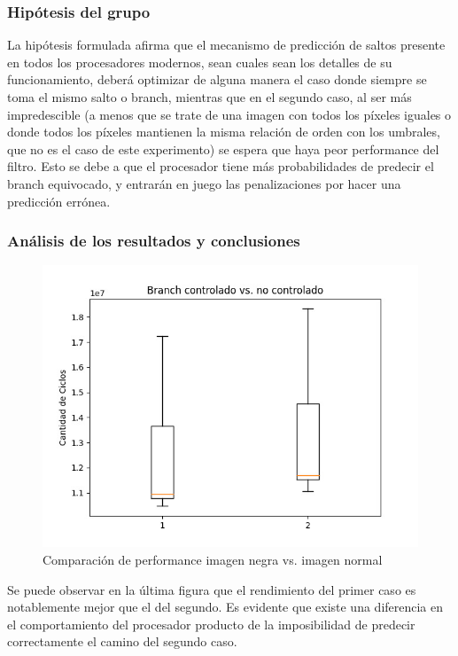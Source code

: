 \subsubsection{Hipótesis del grupo}
\par La hipótesis formulada afirma que el mecanismo de predicción de saltos presente en todos los procesadores modernos, sean cuales sean los detalles de su funcionamiento, deberá optimizar 
de alguna manera el caso donde siempre se toma el mismo salto o branch, mientras que en el segundo caso, al ser más impredescible (a menos que se trate de una imagen con todos los píxeles iguales 
o donde todos los píxeles mantienen la misma relación de orden con los umbrales, que no es el caso de este experimento) se espera que haya peor performance del filtro.
Esto se debe a que el procesador tiene más probabilidades de predecir el branch equivocado, y entrarán en juego las penalizaciones por hacer una predicción errónea.

\subsubsection{Análisis de los resultados y conclusiones}
\begin{figure}[h]
    \centering
        \includegraphics[width=0.5\linewidth]{img/BranchControladoVsNOControlado.jpeg}\hfil
        \caption{Comparación de performance imagen negra vs. imagen normal}
\end{figure}
\par Se puede observar en la última figura que el rendimiento del primer caso es notablemente mejor que el del segundo. Es evidente que existe una diferencia en el comportamiento del procesador
producto de la imposibilidad de predecir correctamente el camino del segundo caso.